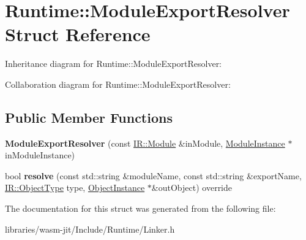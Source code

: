 \hypertarget{struct_runtime_1_1_module_export_resolver}{}\section{Runtime\+:\+:Module\+Export\+Resolver Struct Reference}
\label{struct_runtime_1_1_module_export_resolver}


Inheritance diagram for Runtime\+:\+:Module\+Export\+Resolver\+:


Collaboration diagram for Runtime\+:\+:Module\+Export\+Resolver\+:
\subsection*{Public Member Functions}
\begin{DoxyCompactItemize}
\item 
\mbox{\label{struct_runtime_1_1_module_export_resolver_ab887e7d30d7e2ccde81f0737cdab1ad8}} 
{\bfseries Module\+Export\+Resolver} (const \mbox{\hyperlink{struct_i_r_1_1_module}{I\+R\+::\+Module}} \&in\+Module, \mbox{\hyperlink{struct_runtime_1_1_module_instance}{Module\+Instance}} $\ast$in\+Module\+Instance)
\item 
\mbox{\label{struct_runtime_1_1_module_export_resolver_af72a8f24c5c5c1501466dc94b57eb97f}} 
bool {\bfseries resolve} (const std\+::string \&module\+Name, const std\+::string \&export\+Name, \mbox{\hyperlink{struct_i_r_1_1_object_type}{I\+R\+::\+Object\+Type}} type, \mbox{\hyperlink{struct_runtime_1_1_object_instance}{Object\+Instance}} $\ast$\&out\+Object) override
\end{DoxyCompactItemize}


The documentation for this struct was generated from the following file\+:\begin{DoxyCompactItemize}
\item 
libraries/wasm-\/jit/\+Include/\+Runtime/Linker.\+h\end{DoxyCompactItemize}
